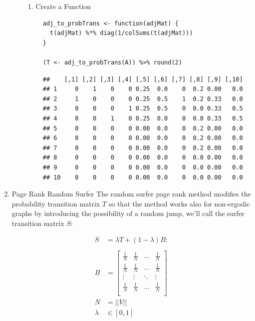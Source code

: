 \documentclass[11pt]{article}
\begin{document}
\begin{enumerate}
\begin{enumerate}
\begin{enumerate}
\item Create a Function
\label{create-a-function}
\lstset{language=r,label= ,caption= ,captionpos=b,numbers=none}
\begin{lstlisting}
  adj_to_probTrans <- function(adjMat) {
    t(adjMat) %*% diag(1/colSums(t(adjMat)))
  }

  (T <- adj_to_probTrans(A)) %>% round(2)
\end{lstlisting}

\begin{verbatim}
  ##    [,1] [,2] [,3] [,4] [,5] [,6] [,7] [,8] [,9] [,10]
  ## 1     0    1    0    0 0.25  0.0    0  0.2 0.00   0.0
  ## 2     1    0    0    0 0.25  0.5    1  0.2 0.33   0.0
  ## 3     0    0    0    1 0.25  0.5    0  0.0 0.33   0.5
  ## 4     0    0    1    0 0.25  0.0    0  0.0 0.33   0.5
  ## 5     0    0    0    0 0.00  0.0    0  0.2 0.00   0.0
  ## 6     0    0    0    0 0.00  0.0    0  0.2 0.00   0.0
  ## 7     0    0    0    0 0.00  0.0    0  0.2 0.00   0.0
  ## 8     0    0    0    0 0.00  0.0    0  0.0 0.00   0.0
  ## 9     0    0    0    0 0.00  0.0    0  0.0 0.00   0.0
  ## 10    0    0    0    0 0.00  0.0    0  0.0 0.00   0.0
\end{verbatim}
\end{enumerate}
\end{enumerate}

\item Page Rank Random Surfer
\label{page-rank-random-surfer}
The random surfer page rank method modifies the probability transition
matrix \(T\) so that the method works also for non-ergodic graphs by
introducing the possibility of a random jump, we'll call the surfer
transition matrix \(S\):

\begin{align}
    S &= \lambda T +  \left( 1- \lambda \right)B :\\
\ \\
    B&= \begin{bmatrix}
    \frac{1}{N} & \frac{1}{N} & \ldots & \frac{1}{N} \\
    \frac{1}{N} & \frac{1}{N} & \ldots & \frac{1}{N} \\
        \vdots      & \vdots      & \ddots & \vdots \\
    \frac{1}{N} & \frac{1}{N} & \ldots & \frac{1}{N} \\
    \end{bmatrix}  \\
    N&= \left| \left| V \right| \right| \\
    \lambda &\in [0,1]
\end{align}


\end{enumerate}
\end{document}
